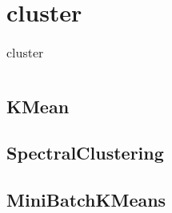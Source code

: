 \chapter{cluster\label{cluster}}
\begin{table}
    \centering
    \caption{cluster}
    \begin{tabular}{lll}
        \hline
        \nameref{KMean} & \nameref{SpectralClustering} & \nameref{MiniBatchKMeans} \\
        \hline
    \end{tabular}
\end{table}
\section{KMean\label{KMean}}
\section{SpectralClustering\label{SpectralClustering}}
\section{MiniBatchKMeans\label{MiniBatchKMeans}}

